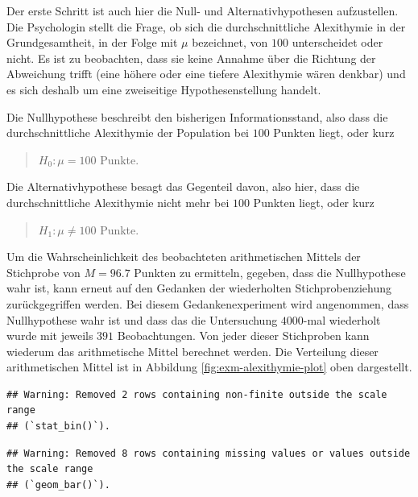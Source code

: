 \documentclass[
]{book}
\theoremstyle{definition}
\theoremstyle{definition}
\theoremstyle{definition}
\theoremstyle{definition}
\theoremstyle{remark}
\begin{document}
Der erste Schritt ist auch hier die Null- und Alternativhypothesen aufzustellen. Die Psychologin stellt die Frage, ob sich die durchschnittliche Alexithymie in der Grundgesamtheit, in der Folge mit \(\mu\) bezeichnet, von \(100\) unterscheidet oder nicht. Es ist zu beobachten, dass sie keine Annahme über die Richtung der Abweichung trifft (eine höhere oder eine tiefere Alexithymie wären denkbar) und es sich deshalb um eine zweiseitige Hypothesenstellung handelt.

Die Nullhypothese beschreibt den bisherigen Informationsstand, also dass die durchschnittliche Alexithymie der Population bei \(100\) Punkten liegt, oder kurz

\begin{quote}
\(H_0:\mu = 100\) Punkte.
\end{quote}

Die Alternativhypothese besagt das Gegenteil davon, also hier, dass die durchschnittliche Alexithymie nicht mehr bei \(100\) Punkten liegt, oder kurz

\begin{quote}
\(H_1: \mu \neq 100\) Punkte.
\end{quote}

Um die Wahrscheinlichkeit des beobachteten arithmetischen Mittels der Stichprobe von \(M = 96.7\) Punkten zu ermitteln, gegeben, dass die Nullhypothese wahr ist, kann erneut auf den Gedanken der wiederholten Stichprobenziehung zurückgegriffen werden. Bei diesem Gedankenexperiment wird angenommen, dass Nullhypothese wahr ist und dass das die Untersuchung \(4000\)-mal wiederholt wurde mit jeweils \(391\) Beobachtungen. Von jeder dieser Stichproben kann wiederum das arithmetische Mittel berechnet werden. Die Verteilung dieser arithmetischen Mittel ist in Abbildung \ref{fig:exm-alexithymie-plot} oben dargestellt.

\begin{verbatim}
## Warning: Removed 2 rows containing non-finite outside the scale range
## (`stat_bin()`).
\end{verbatim}

\begin{verbatim}
## Warning: Removed 8 rows containing missing values or values outside the scale range
## (`geom_bar()`).
\end{verbatim}
\end{document}
